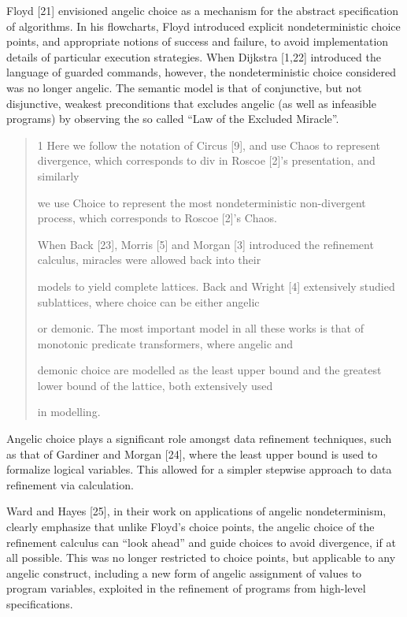 \documentclass[11pt]{article}
\begin{document}
Floyd [21] envisioned angelic choice as a mechanism for the abstract specification of algorithms. In his flowcharts, Floyd introduced explicit nondeterministic choice points, and appropriate notions of success and failure, to avoid implementation details of particular execution strategies. When Dijkstra [1,22] introduced the language of guarded commands, however, the nondeterministic choice considered was no longer angelic. The semantic model is that of conjunctive, but not disjunctive, weakest preconditions that excludes angelic (as well as infeasible programs) by observing the so called “Law of the Excluded Miracle”.

\begin{quote}\small\raggedright
1 Here we follow the notation of Circus [9], and use Chaos to represent divergence, which corresponds to div in Roscoe [2]’s presentation, and similarly
\par
we use Choice to represent the most nondeterministic non-divergent process, which corresponds to Roscoe [2]’s Chaos.
\par
When Back [23], Morris [5] and Morgan [3] introduced the refinement calculus, miracles were allowed back into their
\par
models to yield complete lattices. Back and Wright [4] extensively studied sublattices, where choice can be either angelic
\par
or demonic. The most important model in all these works is that of monotonic predicate transformers, where angelic and
\par
demonic choice are modelled as the least upper bound and the greatest lower bound of the lattice, both extensively used
\par
in modelling.
\end{quote}

Angelic choice plays a significant role amongst data refinement techniques, such as that of Gardiner and Morgan [24], where the least upper bound is used to formalize logical variables. This allowed for a simpler stepwise approach to data refinement via calculation.

Ward and Hayes [25], in their work on applications of angelic nondeterminism, clearly emphasize that unlike Floyd’s choice points, the angelic choice of the refinement calculus can “look ahead” and guide choices to avoid divergence, if at all possible. This was no longer restricted to choice points, but applicable to any angelic construct, including a new form of angelic assignment of values to program variables, exploited in the refinement of programs from high-level specifications.
\end{document}
